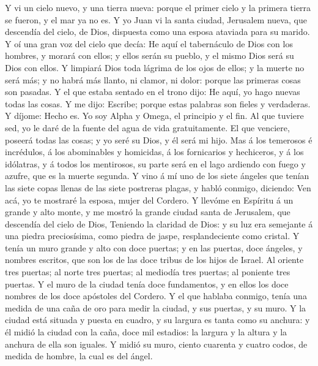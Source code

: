  Y vi un cielo nuevo, y una tierra nueva: porque el primer
cielo y la primera tierra se fueron, y el mar ya no es.  Y
yo Juan vi la santa ciudad, Jerusalem nueva, que descendía del cielo, de
Dios, dispuesta como una esposa ataviada para su marido.  Y
oí una gran voz del cielo que decía: He aquí el tabernáculo de Dios con
los hombres, y morará con ellos; y ellos serán su pueblo, y el mismo
Dios será su Dios con ellos.  Y limpiará Dios toda lágrima
de los ojos de ellos; y la muerte no será más; y no habrá más llanto, ni
clamor, ni dolor: porque las primeras cosas son pasadas.  Y
el que estaba sentado en el trono dijo: He aquí, yo hago nuevas todas
las cosas. Y me dijo: Escribe; porque estas palabras son fieles y
verdaderas.  Y díjome: Hecho es. Yo soy Alpha y Omega, el
principio y el fin. Al que tuviere sed, yo le daré de la fuente del agua
de vida gratuitamente.  El que venciere, poseerá todas las
cosas; y yo seré su Dios, y él será mi hijo.  Mas á los
temerosos é incrédulos, á los abominables y homicidas, á los fornicarios
y hechiceros, y á los idólatras, y á todos los mentirosos, su parte será
en el lago ardiendo con fuego y azufre, que es la muerte segunda.
 Y vino á mí uno de los siete ángeles que tenían las siete
copas llenas de las siete postreras plagas, y habló conmigo, diciendo:
Ven acá, yo te mostraré la esposa, mujer del Cordero.  Y
llevóme en Espíritu á un grande y alto monte, y me mostró la grande
ciudad santa de Jerusalem, que descendía del cielo de Dios,
 Teniendo la claridad de Dios: y su luz era semejante á una
piedra preciosísima, como piedra de jaspe, resplandeciente como cristal.
 Y tenía un muro grande y alto con doce puertas; y en las
puertas, doce ángeles, y nombres escritos, que son los de las doce
tribus de los hijos de Israel.  Al oriente tres puertas; al
norte tres puertas; al mediodía tres puertas; al poniente tres puertas.
 Y el muro de la ciudad tenía doce fundamentos, y en ellos
los doce nombres de los doce apóstoles del Cordero.  Y el
que hablaba conmigo, tenía una medida de una caña de oro para medir la
ciudad, y sus puertas, y su muro.  Y la ciudad está situada
y puesta en cuadro, y su largura es tanta como su anchura: y él midió la
ciudad con la caña, doce mil estadios: la largura y la altura y la
anchura de ella son iguales.  Y midió su muro, ciento
cuarenta y cuatro codos, de medida de hombre, la cual es del ángel.
